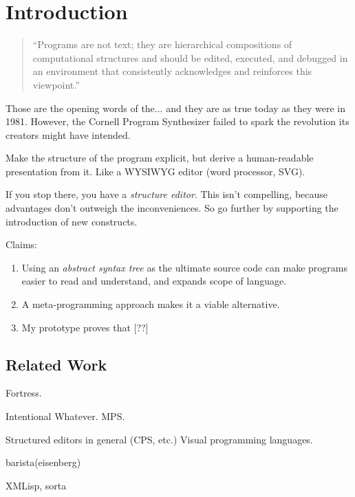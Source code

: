\section{Introduction}

\begin{quote}
``Programs are not text; they are hierarchical compositions of computational structures and should be edited, executed, and debugged in an environment that consistently acknowledges and reinforces this viewpoint.''\cite{teitelbaum}
\end{quote}

Those are the opening words of the... and they are as true today as they were in 1981. However, the Cornell Program Synthesizer failed to spark the revolution its creators might have intended.



Make the structure of the program explicit, but derive a human-readable presentation from it. Like a WYSIWYG editor (word processor, SVG). 

If you stop there, you have a \emph{structure editor}\cite{teitelbaum}. This isn't compelling, because advantages don't outweigh the inconveniences. So go further by supporting the introduction of new constructs.

Claims:
\begin{enumerate}
\item Using an \emph{abstract syntax tree} as the ultimate source code can make programs easier to read and understand, and expands scope of language.
\item A meta-programming approach makes it a viable alternative.
\item My prototype proves that [??]
\end{enumerate}


\subsection{Related Work}
Fortress. 

Intentional Whatever. MPS. 

Structured editors in general (CPS, etc.) Visual programming languages. 

barista(eisenberg)

XMLisp, sorta


